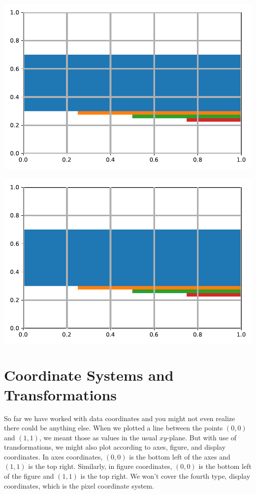 
\begin{center}
    \includegraphics[width = .8\textwidth]{figures/proseplots/front-axes.pdf}
\end{center}


\begin{center}
    \includegraphics[width = .8\textwidth]{figures/proseplots/front-xaxis.pdf}
\end{center}




\section{Coordinate Systems and Transformations}

So far we have worked with data coordinates and you might not even realize there could be anything else. When we plotted a line between the points $(0,0)$ and $(1,1)$, we meant those as values in the usual $xy$-plane. But with use of transformations, we might also plot according to axes, figure, and display coordinates. In axes coordinates, $(0,0)$ is the bottom left of the axes and $(1,1)$ is the top right. Similarly, in figure coordinates, $(0,0)$ is the bottom left of the figure and $(1,1)$ is the top right. We won't cover the fourth type, display coordinates, which is the pixel coordinate system. 

